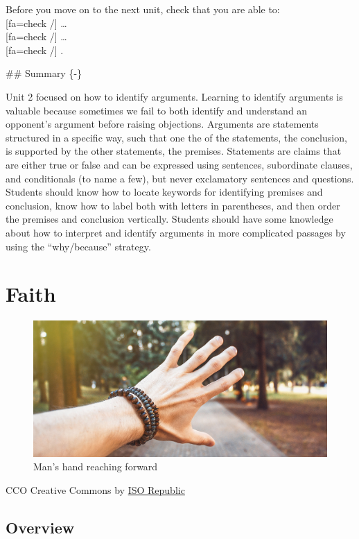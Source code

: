 \documentclass[
]{book}
\begin{document}
\begin{progress}
Before you move on to the next unit, check that you are able to:\\
{[}fa=check /{]} \ldots{}\\
{[}fa=check /{]} \ldots{}\\
{[}fa=check /{]} .
\end{progress}
\#\# Summary \{-\}

Unit 2 focused on how to identify arguments. Learning to identify arguments is valuable because sometimes we fail to both identify and understand an opponent's argument before raising objections. Arguments are statements structured in a specific way, such that one the of the statements, the conclusion, is supported by the other statements, the premises. Statements are claims that are either true or false and can be expressed using sentences, subordinate clauses, and conditionals (to name a few), but never exclamatory sentences and questions. Students should know how to locate keywords for identifying premises and conclusion, know how to label both with letters in parentheses, and then order the premises and conclusion vertically. Students should have some knowledge about how to interpret and identify arguments in more complicated passages by using the ``why/because'' strategy.

\hypertarget{faith}{%
\chapter{Faith}\label{faith}}

\begin{figure}
\centering
\includegraphics{assets/u3/Unit3Overview.jpg}
\caption{Man's hand reaching forward}
\end{figure}

CCO Creative Commons by \href{https://isorepublic.com/photo/hand-reach/}{ISO Republic}

\hypertarget{overview-2}{%
\section{Overview}\label{overview-2}}
\end{document}
